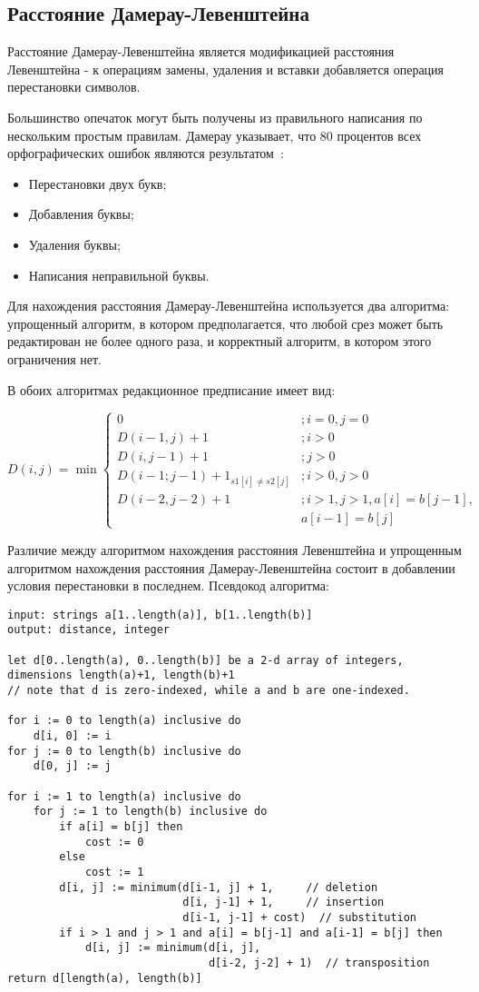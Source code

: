 \subsection{Расстояние Дамерау-Левенштейна}
Расстояние Дамерау-Левенштейна является модификацией расстояния Левенштейна - к операциям замены, удаления и вставки добавляется операция перестановки символов.

Большинство опечаток могут быть получены из правильного написания по нескольким простым правилам. Дамерау указывает, что 80 процентов всех орфографических ошибок являются результатом~\cite{damerau}:

\begin{itemize}
	\item Перестановки двух букв;
	\item Добавления буквы;
	\item Удаления буквы;
	\item Написания неправильной буквы.
\end{itemize}

Для нахождения расстояния Дамерау-Левенштейна используется два алгоритма: упрощенный алгоритм, в котором предполагается, что любой срез может быть редактирован не более одного раза, и корректный алгоритм, в котором этого ограничения нет.

В обоих алгоритмах редакционное предписание имеет вид:

\[
D(i, j) = \min\begin{cases}
0 & ; i = 0, j = 0 \\
D(i-1, j) + 1 & ; i > 0 \\
D(i, j - 1) + 1 & ; j > 0 \\ 
D(i - 1; j - 1) + 1_{s1[i] \neq s2[j]} & ; i > 0, j > 0\\

D(i - 2, j - 2) + 1 & ; i > 1, j > 1, a[i] = b[j - 1],\\ & a[i - 1] = b[j]
\end{cases}
\]

Различие между алгоритмом нахождения расстояния Левенштейна и упрощенным алгоритмом нахождения расстояния Дамерау-Левенштейна состоит в добавлении условия перестановки в последнем. Псевдокод алгоритма:

\begin{lstlisting}
input: strings a[1..length(a)], b[1..length(b)]
output: distance, integer

let d[0..length(a), 0..length(b)] be a 2-d array of integers, dimensions length(a)+1, length(b)+1
// note that d is zero-indexed, while a and b are one-indexed.

for i := 0 to length(a) inclusive do
	d[i, 0] := i
for j := 0 to length(b) inclusive do
	d[0, j] := j

for i := 1 to length(a) inclusive do
	for j := 1 to length(b) inclusive do
		if a[i] = b[j] then
			cost := 0
		else
			cost := 1
		d[i, j] := minimum(d[i-1, j] + 1,     // deletion
						   d[i, j-1] + 1,     // insertion
						   d[i-1, j-1] + cost)  // substitution
		if i > 1 and j > 1 and a[i] = b[j-1] and a[i-1] = b[j] then
			d[i, j] := minimum(d[i, j],
							   d[i-2, j-2] + 1)  // transposition
return d[length(a), length(b)]
\end{lstlisting}

